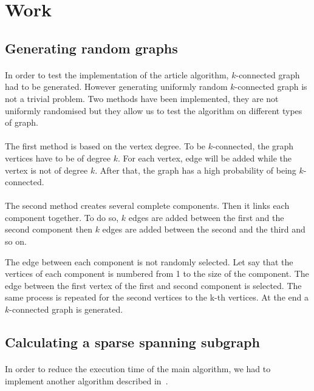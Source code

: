 \section{Work}

\subsection{Generating random graphs}
\paragraph{}
In order to test the implementation of the article algorithm, $k$-connected 
graph had to be generated. However generating uniformly random $k$-connected
graph is not a trivial problem. Two methods have been implemented, they are not
uniformly randomised but they allow us to test the algorithm on different types
of graph.

\paragraph{}
The first method is based on the vertex degree. To be $k$-connected, the graph
vertices have to be of degree $k$. For each vertex, edge will be added while
the vertex is not of degree $k$. After that, the graph has a high probability of
being $k$-connected.

\paragraph{}
The second method creates several complete components. Then it links each component
together. To do so, $k$ edges are added between the first and the second component
then $k$ edges are added between the second and the third and so on.

The edge between each component is not randomly selected. Let say that the vertices
of each component is numbered from 1 to the size of the component. The edge between 
the first vertex of the first and second component is selected. The same process is 
repeated for the second vertices to the k-th vertices. At the end a $k$-connected 
graph is generated. 

\subsection{Calculating a sparse spanning subgraph}
\paragraph{}
In order to reduce the execution time of the main algorithm, we had to
implement another algorithm described in~\cite{NaIb92}.

